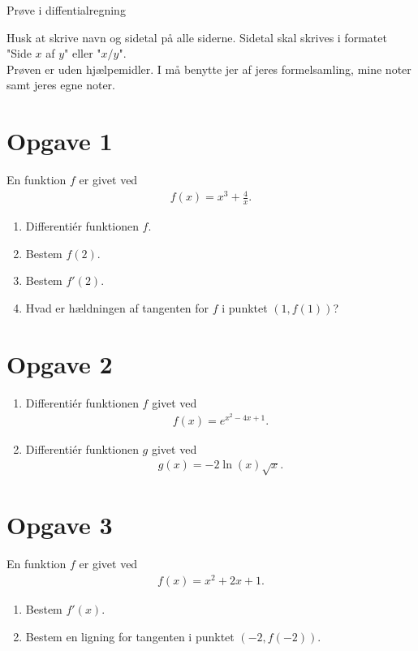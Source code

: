 
\begin{center}
\Huge
Prøve i diffentialregning
\end{center}
\begin{center}
Husk at skrive navn og sidetal på alle siderne. Sidetal skal skrives i formatet "Side $x$ af $y$" eller "$x/y$".\\
Prøven er uden hjælpemidler. I må benytte jer af jeres formelsamling, mine noter samt jeres egne noter.
\end{center}
\section*{Opgave 1}
En funktion $f$ er givet ved
\begin{align*}
f(x) = x^3 + \frac{4}{x}.
\end{align*}
\begin{enumerate}[label=\roman*)]
\item Differentiér funktionen $f$.
\item Bestem $f(2)$.
\item Bestem $f'(2)$.
\item Hvad er hældningen af tangenten for $f$ i punktet $(1,f(1))$?
\end{enumerate}
\section*{Opgave 2}
\begin{enumerate}[label=\roman*)]
\item Differentiér funktionen $f$ givet ved
\begin{align*}
f(x) = e^{x^2-4x+1}.
\end{align*}
\item Differentiér funktionen $g$ givet ved
\begin{align*}
g(x) = -2\ln(x)\sqrt{x}.
\end{align*}
\end{enumerate}
\section*{Opgave 3}
En funktion $f$ er givet ved 
\begin{align*}
f(x) = x^2+2x+1.
\end{align*}
\begin{enumerate}[label=\roman*)]
\item Bestem $f'(x)$.
\item Bestem en ligning for tangenten i punktet $(-2,f(-2))$.
\end{enumerate}
